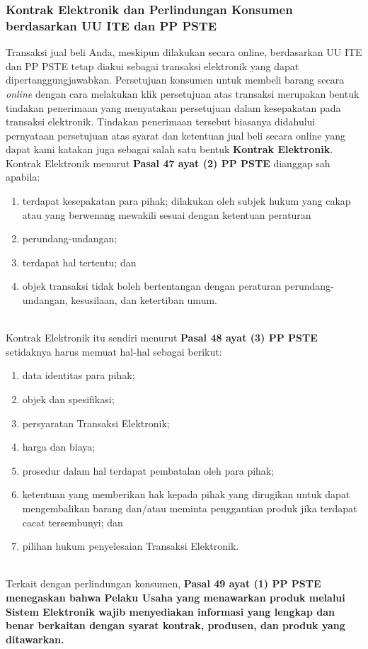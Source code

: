 \subsubsection{Kontrak Elektronik dan Perlindungan Konsumen berdasarkan UU ITE dan PP PSTE}
Transaksi jual beli Anda, meskipun dilakukan secara online, berdasarkan UU ITE dan PP PSTE tetap diakui sebagai transaksi elektronik yang dapat dipertanggungjawabkan. Persetujuan konsumen untuk membeli barang secara \textit{online} dengan cara melakukan klik persetujuan atas transaksi merupakan bentuk tindakan penerimaan yang menyatakan persetujuan dalam kesepakatan pada transaksi elektronik. Tindakan penerimaan tersebut biasanya didahului pernyataan persetujuan atas syarat dan ketentuan jual beli secara online yang dapat kami katakan juga sebagai salah satu bentuk \textbf{Kontrak Elektronik}. Kontrak Elektronik menurut \textbf{Pasal 47 ayat (2) PP PSTE} dianggap sah apabila:
\begin{enumerate}[label=\alph*.]
	\item terdapat kesepakatan para pihak;
	dilakukan oleh subjek hukum yang cakap atau yang berwenang mewakili sesuai dengan ketentuan peraturan \item perundang-undangan;
	\item terdapat hal tertentu; dan
	\item objek transaksi tidak boleh bertentangan dengan peraturan perundang-undangan, kesusilaan, dan ketertiban umum.
\end{enumerate}
\ \\
\indent Kontrak Elektronik itu sendiri menurut \textbf{Pasal 48 ayat (3) PP PSTE} setidaknya harus memuat hal-hal sebagai berikut:
\begin{enumerate}[label=\alph*.]
	\item data identitas para pihak;
	\item objek dan spesifikasi;
	\item persyaratan Transaksi Elektronik;
	\item harga dan biaya;
	\item prosedur dalam hal terdapat pembatalan oleh para pihak;
	\item ketentuan yang memberikan hak kepada pihak yang dirugikan untuk dapat mengembalikan barang dan/atau meminta penggantian produk jika terdapat cacat tersembunyi; dan
	\item pilihan hukum penyelesaian Transaksi Elektronik.
\end{enumerate}
\ \\
\indent Terkait dengan perlindungan konsumen, \textbf{Pasal 49 ayat (1) PP PSTE menegaskan bahwa Pelaku Usaha yang menawarkan produk melalui Sistem Elektronik wajib menyediakan informasi yang lengkap dan benar berkaitan dengan syarat kontrak, produsen, dan produk yang ditawarkan.}

